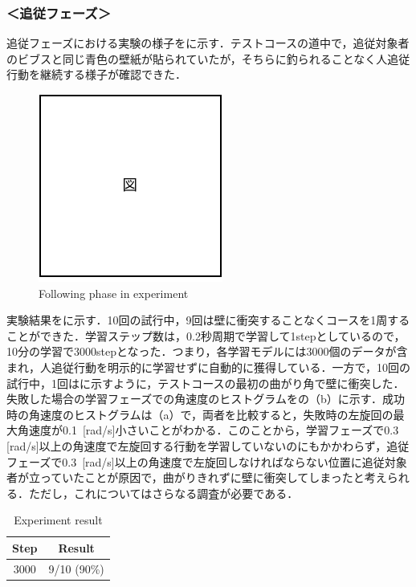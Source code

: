 \newpage

  \subsubsection*{＜追従フェーズ＞}
  
  追従フェーズにおける実験の様子をに示す．テストコースの道中で，追従対象者のビブスと同じ青色の壁紙が貼られていたが，そちらに釣られることなく人追従行動を継続する様子が確認できた．

  \begin{figure}[h]
    \centering
    \includegraphics[keepaspectratio, scale=0.80] {images/pdf/figure}
    \captionsetup{justification=raggedright} %
    \caption{Following phase in experiment}
    \label{Fig:Following phase in experiment}
  \end{figure}

  実験結果をに示す．10回の試行中，9回は壁に衝突することなくコースを1周することができた．学習ステップ数は，0.2秒周期で学習して1stepとしているので，10分の学習で3000stepとなった．つまり，各学習モデルには3000個のデータが含まれ，人追従行動を明示的に学習せずに自動的に獲得している．一方で，10回の試行中，1回はに示すように，テストコースの最初の曲がり角で壁に衝突した．失敗した場合の学習フェーズでの角速度のヒストグラムをの（b）に示す．成功時の角速度のヒストグラムは（a）で，両者を比較すると，失敗時の左旋回の最大角速度が0.1\, [rad/s]小さいことがわかる．このことから，学習フェーズで0.3\, [rad/s]以上の角速度で左旋回する行動を学習していないのにもかかわらず，追従フェーズで0.3\, [rad/s]以上の角速度で左旋回しなければならない位置に追従対象者が立っていたことが原因で，曲がりきれずに壁に衝突してしまったと考えられる．ただし，これについてはさらなる調査が必要である．

  \begin{table}[h]
    \caption{Experiment result}
    \label{tab:Experiment result}
    \centering
    \begin{tabular}{|c|c|}
    \hline
    Step & Result      \\ \hline
    3000 & 9/10 (90\%) \\ \hline
    \end{tabular}
    \end{table}


